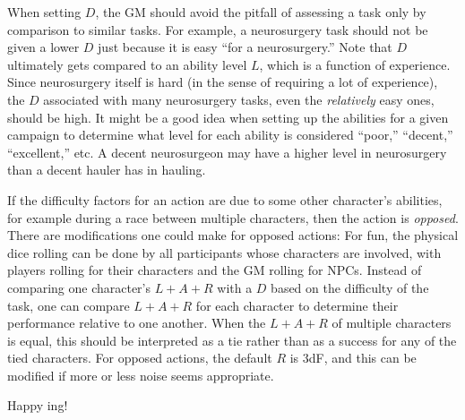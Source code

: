 When setting $D$, the GM should avoid the pitfall of assessing a task only by comparison to similar tasks.
For example, a neurosurgery task should not be given a lower $D$ just because it is easy ``for a neurosurgery.''
Note that $D$ ultimately gets compared to an ability level $L$, which is a function of experience.
Since neurosurgery itself is hard (in the sense of requiring a lot of experience), the $D$ associated with many neurosurgery tasks, even the \emph{relatively} easy ones, should be high.
It might be a good idea when setting up the abilities for a given campaign to determine what level for each ability is considered ``poor,'' ``decent,'' ``excellent,'' etc.
A decent neurosurgeon may have a higher level in neurosurgery than a decent hauler has in hauling.

If the difficulty factors for an action are due to some other character's abilities, for example during a race between multiple characters, then the action is \emph{opposed}.
There are modifications one could make for opposed actions:
For fun, the physical dice rolling can be done by all participants whose characters are involved, with players rolling for their characters and the GM rolling for NPCs.
Instead of comparing one character’s $L + A + R$ with a $D$ based on the difficulty of the task, one can compare $L + A + R$ for each character to determine their performance relative to one another.
When the $L + A + R$ of multiple characters is equal, this should be interpreted as a tie rather than as a success for any of the tied characters.
For opposed actions, the default $R$ is $3$dF, and this can be modified if more or less noise seems appropriate.

Happy \peupfudge{}ing!

